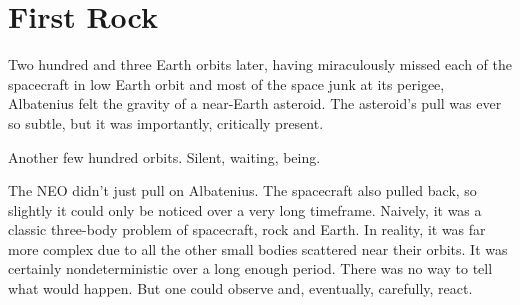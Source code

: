 %
%

\chapter{First Rock}

Two hundred and three Earth orbits later, having miraculously missed each of the spacecraft in low Earth orbit and most of the space junk at its perigee, Albatenius felt the gravity of a near-Earth asteroid. The asteroid's pull was ever so subtle, but it was importantly, critically present.

Another few hundred orbits. Silent, waiting, being.

The NEO didn't just pull on Albatenius. The spacecraft also pulled back, so slightly it could only be noticed over a very long timeframe. Naively, it was a classic three-body problem of spacecraft, rock and Earth. In reality, it was far more complex due to all the other small bodies scattered near their orbits. It was certainly nondeterministic over a long enough period. There was no way to tell what would happen. But one could observe and, eventually, carefully, react.


\newpage
\thispagestyle{empty}
